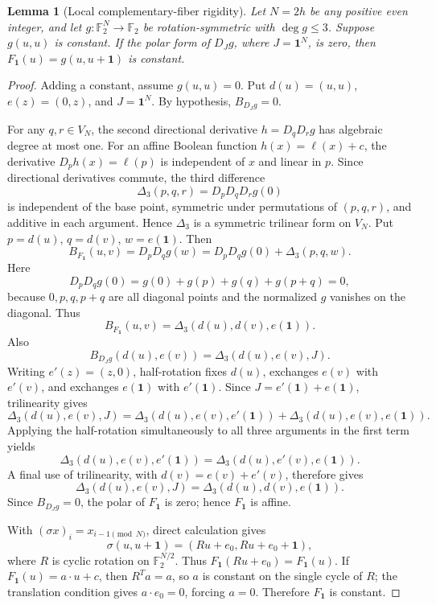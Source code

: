 \documentclass[11pt,a4paper]{article}
\newtheorem{lemma}[theorem]{Lemma}
\theoremstyle{remark}
\theoremstyle{plain}
\newcommand{\F}{\mathbb F_2}
\begin{document}
\begin{lemma}[Local complementary-fiber rigidity]\label{lem:fiber-rigidity}
Let \(N=2h\) be any positive even integer, and let \(g:\F^N\to\F\) be rotation-symmetric with \(\deg g\le3\). Suppose \(g(u,u)\) is constant. If the polar form of \(D_Jg\), where \(J=\mathbf1^N\), is zero, then \(F_{\mathbf1}(u)=g(u,u+\mathbf1)\) is constant.
\end{lemma}
\begin{proof}
Adding a constant, assume \(g(u,u)=0\). Put \(d(u)=(u,u)\), \(e(z)=(0,z)\), and \(J=\mathbf1^N\). By hypothesis, \(B_{D_Jg}=0\).

For any $q,r\in V_N$, the second directional derivative $h=D_qD_rg$ has algebraic degree at most one. For an affine Boolean function $h(x)=\ell(x)+c$, the derivative $D_ph(x)=\ell(p)$ is independent of $x$ and linear in $p$. Since directional derivatives commute, the third difference
\[
\Delta_3(p,q,r)=D_pD_qD_rg(0)
\]
is independent of the base point, symmetric under permutations of $(p,q,r)$, and additive in each argument. Hence $\Delta_3$ is a symmetric trilinear form on $V_N$. Put \(p=d(u)\), \(q=d(v)\), \(w=e(\mathbf1)\). Then
\[
B_{F_{\mathbf1}}(u,v)=D_pD_qg(w)
=D_pD_qg(0)+\Delta_3(p,q,w).
\]
Here
\[
D_pD_qg(0)=g(0)+g(p)+g(q)+g(p+q)=0,
\]
because \(0,p,q,p+q\) are all diagonal points and the normalized \(g\) vanishes on the diagonal. Thus
\[
B_{F_{\mathbf1}}(u,v)=\Delta_3(d(u),d(v),e(\mathbf1)).
\]
Also
\[
B_{D_Jg}(d(u),e(v))=\Delta_3(d(u),e(v),J).
\]
Writing \(e'(z)=(z,0)\), half-rotation fixes \(d(u)\), exchanges \(e(v)\) with \(e'(v)\), and exchanges \(e(\mathbf1)\) with \(e'(\mathbf1)\). Since \(J=e'(\mathbf1)+e(\mathbf1)\), trilinearity gives
\[
\Delta_3(d(u),e(v),J)
=\Delta_3(d(u),e(v),e'(\mathbf1))
 +\Delta_3(d(u),e(v),e(\mathbf1)).
\]
Applying the half-rotation simultaneously to all three arguments in the first term yields
\[
\Delta_3(d(u),e(v),e'(\mathbf1))
=\Delta_3(d(u),e'(v),e(\mathbf1)).
\]
A final use of trilinearity, with \(d(v)=e(v)+e'(v)\), therefore gives
\[
\Delta_3(d(u),e(v),J)
=\Delta_3(d(u),d(v),e(\mathbf1)).
\]
Since \(B_{D_Jg}=0\), the polar of \(F_{\mathbf1}\) is zero; hence \(F_{\mathbf1}\) is affine.

With \((\sigma x)_i=x_{i-1\pmod N}\), direct calculation gives
\[
\sigma(u,u+\mathbf1)=(Ru+e_0,Ru+e_0+\mathbf1),
\]
where \(R\) is cyclic rotation on \(\F^{N/2}\). Thus \(F_{\mathbf1}(Ru+e_0)=F_{\mathbf1}(u)\). If \(F_{\mathbf1}(u)=a\cdot u+c\), then \(R^Ta=a\), so \(a\) is constant on the single cycle of \(R\); the translation condition gives \(a\cdot e_0=0\), forcing \(a=0\). Therefore \(F_{\mathbf1}\) is constant.
\end{proof}
\end{document}
